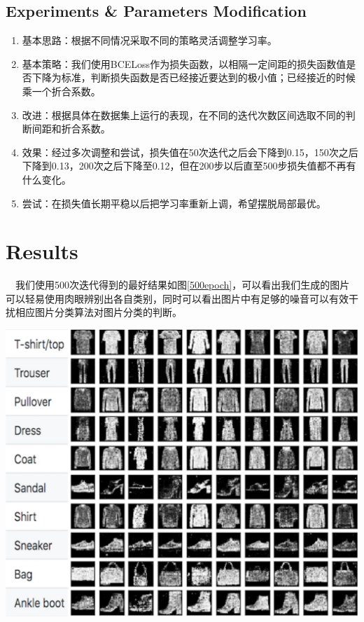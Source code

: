 \documentclass[12pt]{article}
\begin{document}
\subsection*{Experiments \& Parameters Modification}
\begin{enumerate}
	\item 基本思路：根据不同情况采取不同的策略灵活调整学习率。
	\item 基本策略：我们使用BCELoss作为损失函数，以相隔一定间距的损失函数值是否下降为标准，判断损失函数是否已经接近要达到的极小值；已经接近的时候乘一个折合系数。
	\item 改进：根据具体在数据集上运行的表现，在不同的迭代次数区间选取不同的判断间距和折合系数。
	\item 效果：经过多次调整和尝试，损失值在50次迭代之后会下降到0.15，150次之后下降到0.13，200次之后下降至0.12，但在200步以后直至500步损失值都不再有什么变化。
	\item 尝试：在损失值长期平稳以后把学习率重新上调，希望摆脱局部最优。
\end{enumerate}


\section*{Results}
\ \ 我们使用500次迭代得到的最好结果如图\ref{500epoch}，可以看出我们生成的图片可以轻易使用肉眼辨别出各自类别，同时可以看出图片中有足够的噪音可以有效干扰相应图片分类算法对图片分类的判断。

\begin{center}\vspace{1cm}
\includegraphics[width=1.0\linewidth]{label_epoch500.png}
\label{500epoch}
\end{center}\vspace{1cm}
\end{document}
